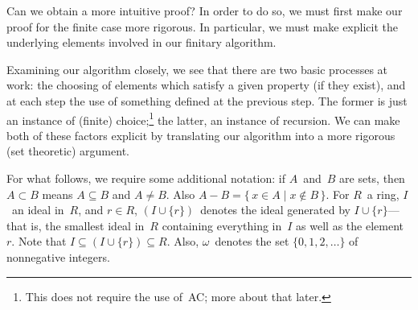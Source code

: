 \documentclass[letterpaper]{article}
\newcommand{\union}{\cup}
\begin{document}
Can we obtain a more intuitive proof? In order to do so, we must first make our proof for the finite case more rigorous. In particular, we must make explicit the underlying elements involved in our finitary algorithm.

Examining our algorithm closely, we see that there are two basic processes at work: the choosing of elements which satisfy a given property (if they exist), and at each step the use of something defined at the previous step. The former is just an instance of (finite) choice;\footnote{This does not require the use of~AC; more about that later.} the latter, an instance of recursion. We can make both of these factors explicit by translating our algorithm into a more rigorous (set theoretic) argument.

For what follows, we require some additional notation: if $A$~and~$B$ are sets, then $A\subset B$ means $A\subseteq B$ and $A\ne B$. Also $A-B=\{\,x\in A\mid x\not\in B\,\}$. For $R$~a ring, $I$~an ideal in~$R$, and $r\in R$, $(I\union\{r\})$~denotes the ideal generated by $I\union\{r\}$---that is, the smallest ideal in~$R$ containing everything in~$I$ as well as the element~$r$. Note that $I\subseteq(I\union\{r\})\subseteq R$. Also, $\omega$~denotes the set $\{0,1,2,\ldots\}$ of nonnegative integers.
\end{document}
